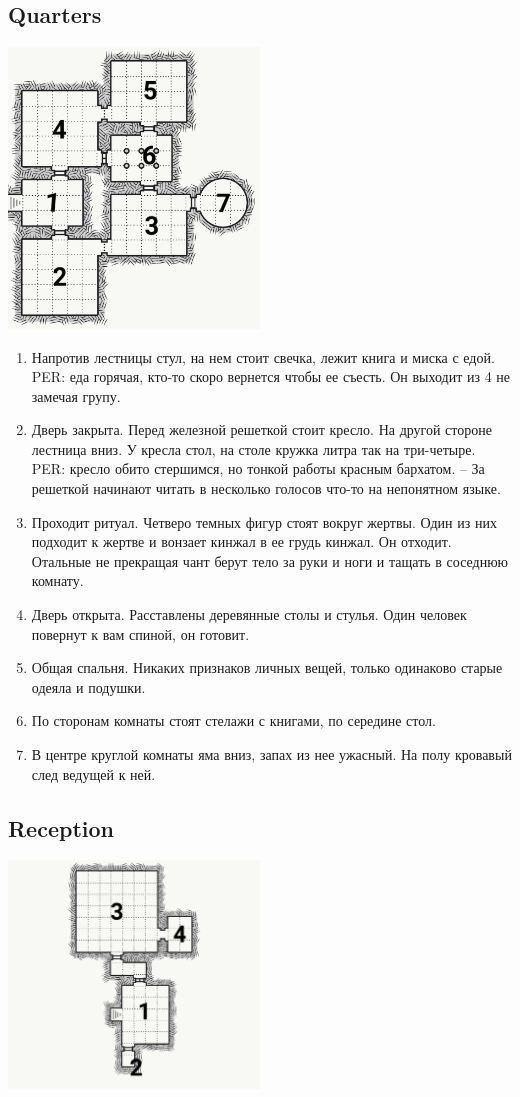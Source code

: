 \documentclass[a5paper,11pt]{book}
\begin{document}
\begin{multicols}{2}
\subsection{Quarters}
\includegraphics[width=0.5\textwidth]{4}
\begin{enumerate}
\item Напротив лестницы стул, на нем стоит свечка, лежит книга и миска с едой. PER: еда горячая, кто-то скоро вернется чтобы ее съесть. Он выходит из 4 не замечая групу.
\item Дверь закрыта. Перед железной решеткой стоит кресло. На другой стороне лестница вниз. У кресла стол, на столе кружка литра так на три-четыре. PER: кресло обито стершимся, но тонкой работы красным бархатом. -- За решеткой начинают читать в несколько голосов что-то на непонятном языке.
\item Проходит ритуал. Четверо темных фигур стоят вокруг жертвы. Один из них подходит к жертве и вонзает кинжал в ее грудь кинжал. Он отходит. Отальные не прекращая чант берут тело за руки и ноги и тащать в соседнюю комнату.
\item Дверь открыта. Расставлены деревянные столы и стулья. Один человек повернут к вам спиной, он готовит.
\item Общая спальня. Никаких признаков личных вещей, только одинаково старые одеяла и подушки.
\item По сторонам комнаты стоят стелажи с книгами, по середине стол.
\item В центре круглой комнаты яма вниз, запах из нее ужасный. На полу кровавый след ведущей к ней.
\end{enumerate}

\pagebreak

\subsection{Reception}
\includegraphics[width=0.5\textwidth]{5}


\end{multicols}
\end{document}
